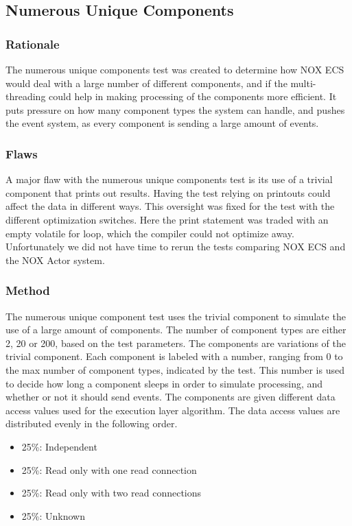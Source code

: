 \subsection{Numerous Unique Components}
\subsubsection{Rationale}
The numerous unique components test was created to determine how NOX ECS would deal with a large number of different components,
and if the multi-threading could help in making processing of the components more efficient.
It puts pressure on how many component types the system can handle, and pushes the event system, as every component is sending a large amount of events.

\subsubsection{Flaws}
A major flaw with the numerous unique components test is its use of a trivial component that prints out results.
Having the test relying on printouts could affect the data in different ways.
This oversight was fixed for the test with the different optimization switches.
Here the print statement was traded with an empty volatile for loop, which the compiler could not optimize away.
Unfortunately we did not have time to rerun the tests comparing NOX ECS and the NOX Actor system.

\subsubsection{Method}
The numerous unique component test uses the trivial component to simulate the use of a large amount of components.
The number of component types are either 2, 20 or 200, based on the test parameters. The components are variations of the trivial component.
Each component is labeled with a number, ranging from 0 to the max number of component types, indicated by the test.
This number is used to decide how long a component sleeps in order to simulate processing, and whether or not it should send events.
The components are given different data access values used for the execution layer algorithm.
The data access values are distributed evenly in the following order.
\begin{itemize}
    \item 25\%: Independent
    \item 25\%: Read only with one read connection
    \item 25\%: Read only with two read connections
    \item 25\%: Unknown
\end{itemize}

